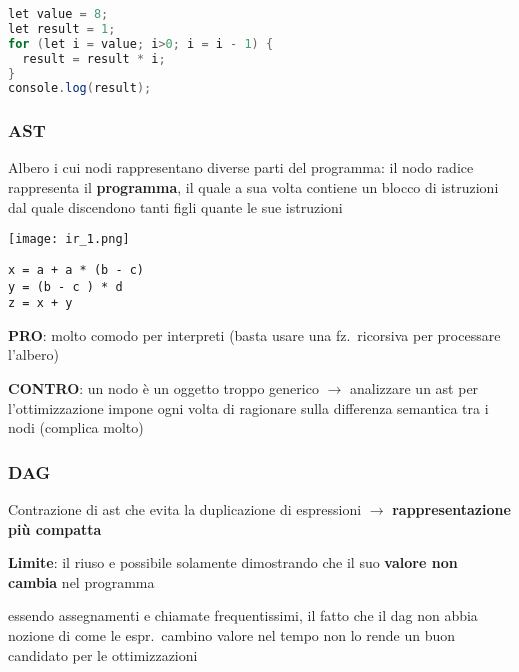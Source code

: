 \begin{lstlisting}[language=java]
let value = 8;
let result = 1;
for (let i = value; i>0; i = i - 1) {
  result = result * i;
}
console.log(result);\end{lstlisting}

\vspace{-.5em}
\subsubsection{AST}

Albero i cui nodi rappresentano diverse parti del programma: il nodo radice rappresenta il \textbf{programma}, il quale a sua volta contiene un blocco di istruzioni dal quale discendono tanti figli quante le sue istruzioni

\noindent\begin{minipage}[c]{.3\textwidth}
\texttt{[image: ir\_1.png]}
\end{minipage}
\begin{minipage}[c]{.7\textwidth}
\begin{lstlisting}
x = a + a * (b - c)
y = (b - c ) * d
z = x + y\end{lstlisting}
\textbf{PRO}: molto comodo per interpreti (basta usare una fz.~ricorsiva per processare l'albero)

\textbf{CONTRO}: un nodo \`e un oggetto troppo generico $\rightarrow$ analizzare un ast per l'ottimizzazione impone ogni volta di ragionare sulla differenza semantica tra i nodi (complica molto)
\end{minipage}


\vspace{-.5em}
\subsubsection{DAG}

Contrazione di ast che evita la duplicazione di espressioni $\rightarrow$ \textbf{rappresentazione pi\`u compatta}

\noindent\textbf{Limite}: il riuso e possibile solamente dimostrando che il suo \textbf{valore non cambia} nel programma
\begin{emphasize}
  essendo assegnamenti e chiamate frequentissimi, il fatto che il dag non abbia nozione di come le espr.~cambino valore nel tempo non lo rende un buon candidato per le ottimizzazioni
\end{emphasize}

